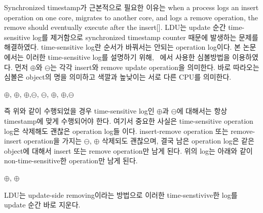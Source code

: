 \ifkor
Synchronized timestamp가 근본적으로 필요한 이유는 when a process logs an insert
operation on one core, migrates to another core, and logs a remove operation, the remove should
eventually execute after the insert[].
LDU는 update 순간 time-sensitive log를 제거함으로 synchronized timestamp counter 때문에 발생하는
문제를 해결하였다.
time-sensitive log란 순서가 바꿔서는 안되는 operation log이다. 
본 논문에서는 이러한 time-sensitive log를 설명하기 위해, ~\cite{Clements15SCR}에서 사용한 심볼방법을
이용하였다.
먼저 $\oplus$와 $\ominus$는 각각 insert와 remove update operation을 의미한다.
바로 따라오는 심볼은 object의 명을 의미하고 색깔과 높낮이는 서로 다른 CPU를 의미한다.
\begin{center}
$\oplus$, $\oplus$, $\oplus$,$\ominus$,
$\ominus$, $\oplus$, $\oplus$,$\ominus$
\end{center}
즉 위와 같이 수행되었을 경우 time-sensitive log인 $\oplus$과 $\ominus$에
대해서는 항상 timestamp에 맞게 수행되어야 한다.
여기서 중요한 사실은 time-sensitive operation log은 삭제해도 괜찮은 operation log들 이다.
insert-remove operation 또는 remove-insert operation을 가지는 
$\ominus$, $\oplus$ 삭제되도 괜찮으며, 결국 남은 operation log은 같은
object에 대해서 insert 또는 remove operation만 남게 된다.
위의 log는 아래와 같이 non-time-sensitive한 operation만 남게 된다.
\begin{center}
 $\oplus$, $\oplus$
\end{center}
LDU는 update-side removing이라는 방법으로 이러한 time-senstivive한 log를 update 순간 바로
지운다.
\else







